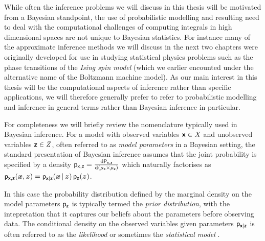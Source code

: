 While often the inference problems we will discuss in this thesis will be motivated from a Bayesian standpoint, the use of probabilistic modelling and resulting need to deal with the computational challenges of computing integrals in high dimensional spaces are not unique to Bayesian statistics. For instance many of the approximate inference methods we will discuss in the next two chapters were originally developed for use in studying statistical physics problems such as the phase transitions of the \emph{Ising spin model} (which we earlier encounted under the alternative name of the Boltzmann machine model). As our main interest in this thesis will be the computational aspects of inference rather than specific applications, we will therefore generally prefer to refer to probabilistic modelling and inference in general terms rather than Bayesian inference in particular.


For completeness we will briefly review the nomenclature typically used in Bayesian inference. For a model with observed variables $\boldsymbol{\mathsf{x}} \in \mathit{X}$ and unobserved variables $\boldsymbol{\mathsf{z}} \in \mathit{Z}$, often referred to as \emph{model parameters} in a Bayesian setting, the standard presentation of Bayesian inference assumes that the joint probability is specified by a density $\mathsf{p}_{\mathsf{x},\mathsf{z}} = \frac{\mathrm{d} \mathsf{P}_{\boldsymbol{\mathsf{x}},\boldsymbol{\mathsf{z}}}}{\mathrm{d} (\mu_{\boldsymbol{\mathsf{x}}} \times \mu_{\boldsymbol{\mathsf{z}}})}$ which naturally factorises as $\mathsf{p}_{\boldsymbol{\mathsf{x}},\boldsymbol{\mathsf{z}}}(\boldsymbol{x},\boldsymbol{z}) = \mathsf{p}_{\boldsymbol{\mathsf{x}}|\boldsymbol{\mathsf{z}}}(\boldsymbol{x}\operatorname{|}\boldsymbol{z})\,\mathsf{p}_{\boldsymbol{\mathsf{z}}}(\boldsymbol{z})$. 

In this case the probability distribution defined by the marginal density on the model parameters $\mathsf{p}_{\boldsymbol{\mathsf{z}}}$ is typically termed the \emph{prior distribution}, with the intepretation that it captures our beliefs about the parameters before observing data. The conditional density on the observed variables given parameters $\mathsf{p}_{\boldsymbol{\mathsf{x}}|\boldsymbol{\mathsf{z}}}$ is often referred to as the \emph{likelihood} or sometimes the \emph{statistical model} \citep{robert2007bayesian}.%

